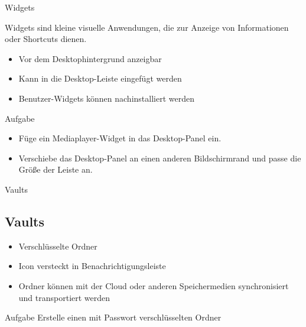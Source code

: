 \begin{frame}{Widgets}

    Widgets sind kleine visuelle Anwendungen, die zur Anzeige von Informationen oder Shortcuts
    dienen.

    \pause

    \begin{itemize}
        \item Vor dem Desktophintergrund anzeigbar\pause
        \item Kann in die Desktop-Leiste eingefügt werden\pause
        \item Benutzer-Widgets können nachinstalliert werden
    \end{itemize}

    \pause
    \vspace{0.5cm}
    \begin{alertblock}{Aufgabe}
        \begin{itemize}
            \item Füge ein Mediaplayer-Widget in das Desktop-Panel ein.
            \item Verschiebe das Desktop-Panel an einen anderen Bildschirmrand und passe die Größe der Leiste an.
        \end{itemize}
    \end{alertblock}
\end{frame}

\begin{frame}{Vaults}
    \subsection{Vaults}\label{subsec:vaults}
    \begin{itemize}
        \item Verschlüsselte Ordner\pause
        \item Icon versteckt in Benachrichtigungsleiste\pause
        \item Ordner können mit der Cloud oder anderen Speichermedien synchronisiert und
        transportiert werden
    \end{itemize}

    \pause
    \vspace{0.5cm}
    \begin{alertblock}{Aufgabe}
        Erstelle einen mit Passwort verschlüsselten Ordner
    \end{alertblock}
\end{frame}